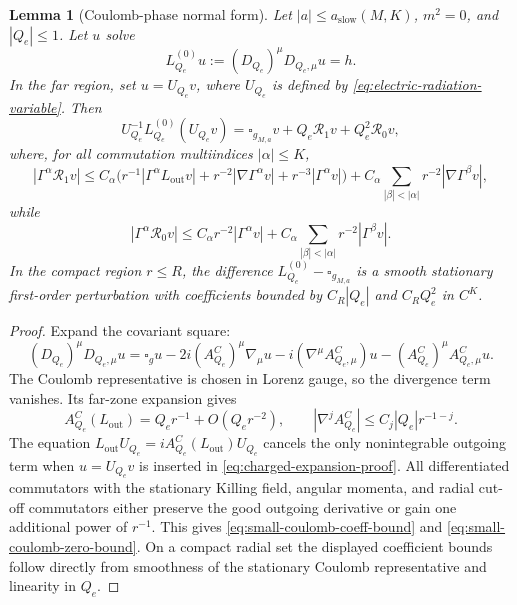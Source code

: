 \documentclass[11pt]{article}
\numberwithin{equation}{section}
\theoremstyle{plain}
\newtheorem{lemma}[theorem]{Lemma}
\theoremstyle{definition}
\theoremstyle{remark}
\begin{document}
\begin{lemma}[Coulomb-phase normal form]\label{lem:small-coulomb-normal-form}
Let \(|a|\le a_{\mathrm{slow}}(M,K)\), \(m^2=0\), and \(|Q_e|\le1\).  Let \(u\) solve
\begin{equation}
 L_{Q_e}^{(0)}u:= (D_{Q_e})^\mu D_{Q_e,\mu}u=h.
\end{equation}
In the far region, set \(u=U_{Q_e}v\), where \(U_{Q_e}\) is defined by \eqref{eq:electric-radiation-variable}.  Then
\begin{equation}\label{eq:small-coulomb-normal-form-main}
 U_{Q_e}^{-1}L_{Q_e}^{(0)}(U_{Q_e}v)
 =\square_{g_{M,a}}v+Q_e\mathcal R_1v+Q_e^2\mathcal R_0v,
\end{equation}
where, for all commutation multiindices \(|\alpha|\le K\),
\begin{equation}\label{eq:small-coulomb-coeff-bound}
 |\Gamma^\alpha \mathcal R_1v|
 \le C_\alpha\bigl(r^{-1}|\Gamma^\alpha L_{\mathrm{out}}v|+r^{-2}|\nabla \Gamma^\alpha v|+r^{-3}|\Gamma^\alpha v|\bigr)
 +C_\alpha\sum_{|\beta|<|\alpha|}r^{-2}|\nabla\Gamma^\beta v|,
\end{equation}
while
\begin{equation}\label{eq:small-coulomb-zero-bound}
 |\Gamma^\alpha \mathcal R_0v|
 \le C_\alpha r^{-2}|\Gamma^\alpha v|+C_\alpha\sum_{|\beta|<|\alpha|}r^{-2}|\Gamma^\beta v|.
\end{equation}
In the compact region \(r\le R\), the difference \(L_{Q_e}^{(0)}-\square_{g_{M,a}}\) is a smooth stationary first-order perturbation with coefficients bounded by \(C_R|Q_e|\) and \(C_RQ_e^2\) in \(C^K\).
\end{lemma}

\begin{proof}
Expand the covariant square:
\begin{equation}\label{eq:charged-expansion-proof}
 (D_{Q_e})^\mu D_{Q_e,\mu}u
 =\square_g u-2i(A^C_{Q_e})^\mu\nabla_\mu u-i(\nabla^\mu A^C_{Q_e,\mu})u-(A^C_{Q_e})^\mu A^C_{Q_e,\mu}u.
\end{equation}
The Coulomb representative is chosen in Lorenz gauge, so the divergence term vanishes.  Its far-zone expansion gives
\begin{equation}
 A^C_{Q_e}(L_{\mathrm{out}})=Q_er^{-1}+O(Q_er^{-2}),\qquad
 |\nabla^jA^C_{Q_e}|\le C_j|Q_e|r^{-1-j}.
\end{equation}
The equation \(L_{\mathrm{out}}U_{Q_e}=iA^C_{Q_e}(L_{\mathrm{out}})U_{Q_e}\) cancels the only nonintegrable outgoing term when \(u=U_{Q_e}v\) is inserted in \eqref{eq:charged-expansion-proof}.  All differentiated commutators with the stationary Killing field, angular momenta, and radial cut-off commutators either preserve the good outgoing derivative or gain one additional power of \(r^{-1}\).  This gives \eqref{eq:small-coulomb-coeff-bound} and \eqref{eq:small-coulomb-zero-bound}.  On a compact radial set the displayed coefficient bounds follow directly from smoothness of the stationary Coulomb representative and linearity in \(Q_e\).
\end{proof}
\end{document}
